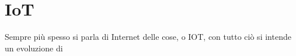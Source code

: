 \section{IoT}
Sempre più spesso si parla di Internet delle cose, o IOT, con tutto ciò si
intende un evoluzione di  

